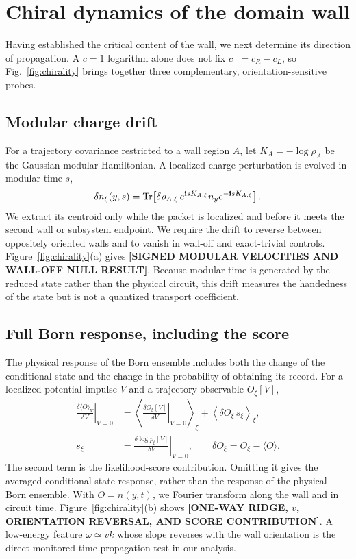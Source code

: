 \documentclass[aps,prx,twocolumn,superscriptaddress,longbibliography,nofootinbib,floatfix]{revtex4-2}
\newcommand{\ii}{\boldsymbol{\mathrm{i}}}
\newcommand{\ResultValue}[1]{\textcolor{BrickRed}{\textbf{[#1]}}}
\begin{document}
\section{Chiral dynamics of the domain wall}
\label{sec:chirality}

Having established the critical content of the wall, we next determine its direction of propagation.  A $c=1$ logarithm alone does not fix $c_-=c_R-c_L$, so Fig.~\ref{fig:chirality} brings together three complementary, orientation-sensitive probes.

\subsection{Modular charge drift}

For a trajectory covariance restricted to a wall region $A$, let $K_A=-\log\rho_A$ be the Gaussian modular Hamiltonian.  A localized charge perturbation is evolved in modular time $s$,
\begin{equation}
 \delta n_\xi(y,s)=
 \Tr\!\left[\delta\rho_{A,\xi}\,
 e^{\ii sK_{A,\xi}}n_y e^{-\ii sK_{A,\xi}}\right].
 \label{eq:modular-evolution}
\end{equation}
We extract its centroid only while the packet is localized and before it meets the second wall or subsystem endpoint.  We require the drift to reverse between oppositely oriented walls and to vanish in wall-off and exact-trivial controls.
Figure~\ref{fig:chirality}(a) gives \ResultValue{SIGNED MODULAR VELOCITIES AND WALL-OFF NULL RESULT}.  Because modular time is generated by the reduced state rather than the physical circuit, this drift measures the handedness of the state but is not a quantized transport coefficient.

\subsection{Full Born response, including the score}

The physical response of the Born ensemble includes both the change of the conditional state and the change in the probability of obtaining its record.  For a localized potential impulse $V$ and a trajectory observable $O_\xi[V]$,
\begin{align}
 \left.\frac{\delta\langle O\rangle_V}{\delta V}\right|_{V=0}
 &=\left\langle
 \left.\frac{\delta O_\xi[V]}{\delta V}\right|_{V=0}
 \right\rangle_\xi
 +\left\langle \delta O_\xi\,s_\xi\right\rangle_\xi,
 \label{eq:born-response}\\
 s_\xi&=\left.\frac{\delta\log p_\xi[V]}{\delta V}\right|_{V=0},
 \qquad
 \delta O_\xi=O_\xi-\langle O\rangle.
 \label{eq:score}
\end{align}
The second term is the likelihood-score contribution.  Omitting it gives the averaged conditional-state response, rather than the response of the physical Born ensemble.  With $O=n(y,t)$, we Fourier transform along the wall and in circuit time.  Figure~\ref{fig:chirality}(b) shows \ResultValue{ONE-WAY RIDGE, $v$, ORIENTATION REVERSAL, AND SCORE CONTRIBUTION}.  A low-energy feature $\omega\simeq vk$ whose slope reverses with the wall orientation is the direct monitored-time propagation test in our analysis.
\end{document}
